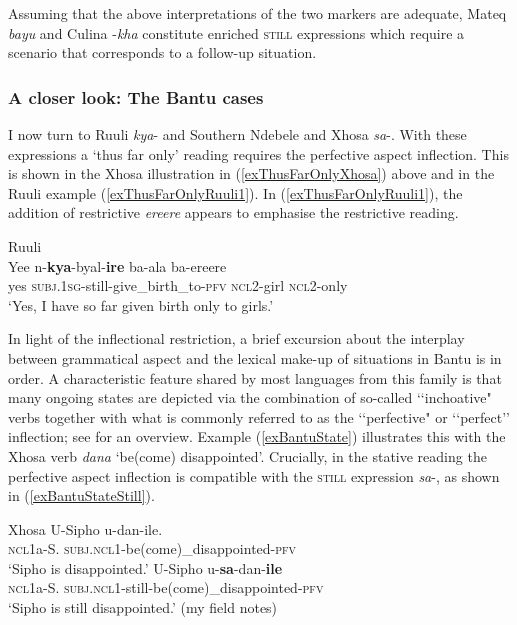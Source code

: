 Assuming that the above interpretations of the two markers are adequate, Mateq \textit{bayu} and Culina \mbox{-\textit{kha}} constitute enriched \textsc{still} expressions which require a  scenario that corresponds to a follow-up situation.

\subsubsection{A closer look: The Bantu cases} I now turn to Ruuli \mbox{\textit{kya}-} and Southern Ndebele and Xhosa \mbox{\textit{sa}-}. With these expressions a \lq thus far only\rq{ }reading requires the perfective aspect inflection. This is shown in the Xhosa illustration in (\ref{exThusFarOnlyXhosa}) above and in the Ruuli example (\ref{exThusFarOnlyRuuli1}). In (\ref{exThusFarOnlyRuuli1}), the addition of restrictive \textit{ereere} appears to emphasise the restrictive reading.

\begin{exe}
	\ex Ruuli\label{exThusFarOnlyRuuli1}\\
	\gll Yee	n-\textbf{kya}-byal-\textbf{ire} ba-ala 	ba-ereere\\
	yes	\textsc{subj}.1\textsc{sg}-still-give\_birth\_to-\textsc{pfv}	\textsc{ncl}2-girl \textsc{ncl}2-only\\
	\glt \lq Yes, I have so far given birth only to girls.\rq{ }\parencite[87]{MolochievaEtAl2021}
\end{exe}

In light of the inflectional restriction, a brief excursion about the interplay between grammatical aspect and the lexical make-up of situations in Bantu is in order. A characteristic feature shared by most languages from this family is that many ongoing states are depicted via the combination  of so-called \lq\lq inchoative" verbs together with what is commonly referred to as the \lq\lq perfective" or \lq\lq perfect\rq\rq{ }inflection; see  \textcite{CranePersohn2019} for an overview. Example (\ref{exBantuState}) illustrates this with the Xhosa verb \textit{dana} \lq be(come) disappointed'. Crucially, in the stative reading the perfective aspect inflection is compatible with the \textsc{still} expression \mbox{\textit{sa}-}, as shown in (\ref{exBantuStateStill}).

\begin{exe}
	\ex 	 
	\begin{xlist}
		\exi{}Xhosa
		\ex\label{exBantuState}
		 \gll U-Sipho u-dan-ile.\\
		\textsc{ncl}1a-S. \textsc{subj}.\textsc{ncl}1-be(come)\_disappointed-\textsc{pfv}\\
		\glt \lq Sipho is disappointed.' 
		\ex\label{exBantuStateStill}
		\gll U-Sipho u-\textbf{sa}-dan-\textbf{ile}\\
		\textsc{ncl}1a-S. \textsc{subj}.\textsc{ncl}1-still-be(come)\_disappointed-\textsc{pfv}\\
		\glt \lq Sipho is still disappointed.' (my field notes)
	\end{xlist}
\end{exe}

